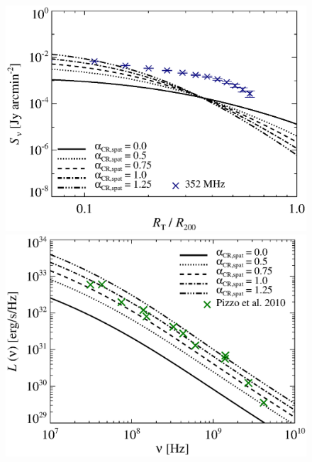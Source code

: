\documentclass[fleqn,usenatbib,useAMS]{mnras}
\newcommand{\Mflatturb}{{\it M-turbulence}\xspace}
\begin{document}
\begin{figure}
\begin{minipage}{1\columnwidth}
\begin{center}
   \end{center}
\end{minipage}
\\
\begin{minipage}{1\columnwidth}
  \begin{center}%
    \includegraphics[width=\columnwidth]{tcltD.prof.comp.KrTTDth.aCR.eps}
  \end{center}
\end{minipage}
\begin{minipage}{1\columnwidth}
   \begin{center}%
     \includegraphics[width=\columnwidth]{tcltD.spec.comp.KrTTDth.aCR.eps}

\end{center}
\end{minipage}
\end{figure}
\end{document}
